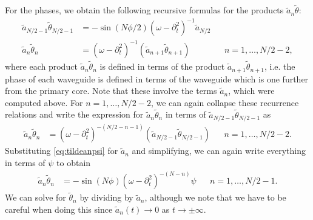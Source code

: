\documentclass[11pt,reqno]{amsart}
\begin{document}
For the phases, we obtain the following recursive formulas for the products $\widetilde{a}_n\widetilde{\theta}$:
\begin{equation}\label{eq:tildeantn}
\begin{aligned}
\widetilde{a}_{N/2-1}\widetilde{\theta}_{N/2-1} &= -\sin(N \phi/2) (\omega - \partial_t^2)^{-1} \widetilde{a}_{N/2} \\
\widetilde{a}_n \widetilde{\theta}_n &= (\omega - \partial_t^2)^{-1} \left( \widetilde{a}_{n+1} \widetilde{\theta}_{n+1} \right) && n = 1, \dots, N/2-2,
\end{aligned}
\end{equation}
where each product $\widetilde{a}_n \widetilde{\theta}_n$ is defined in terms of the product $\widetilde{a}_{n+1} \widetilde{\theta}_{n+1}$, i.e. the phase of each waveguide is defined in terms of the waveguide which is one further from the primary core.
Note that these involve the terms $\widetilde{a}_n$, which were computed above. For $n = 1, \dots, N/2-2$, we can again collapse these recurrence relations and write the expression for $\widetilde{a}_n \widetilde{\theta}_n$ in terms of $\widetilde{a}_{N/2-1} \widetilde{\theta}_{N/2-1}$ as
\begin{align*}
\widetilde{a}_n \widetilde{\theta}_n &= (\omega - \partial_t^2)^{-(N/2-n-1)} \left( \widetilde{a}_{N/2-1} \widetilde{\theta}_{N/2-1} \right) && n = 1, \dots, N/2-2.
\end{align*}
Substituting \cref{eq:tildeanpsi} for $\widetilde{a}_n$ and simplifying, we can again write everything in terms of $\psi$ to obtain
\begin{equation}\label{eq:tildeantnpsi}
\begin{aligned}
\widetilde{a}_n \widetilde{\theta}_n &= -\sin(N \phi) (\omega - \partial_t^2)^{-(N-n)} \psi && n = 1, \dots, N/2-1.
\end{aligned}
\end{equation}
We can solve for $\widetilde{\theta}_n$ by dividing by $\widetilde{a}_n$, although we note that we have to be careful when doing this since $\widetilde{a}_n(t) \rightarrow 0$ as $t \rightarrow \pm \infty$.
\end{document}
